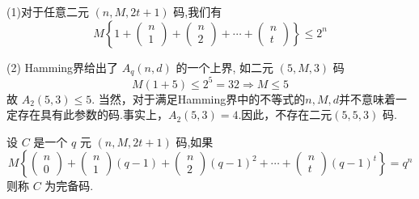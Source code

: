 \begin{remark}

(1)对于任意二元 $ (n, M, 2 t+1) $ 码,我们有
$$
M\left\{1+\left(\begin{array}{c}
n \\
1
\end{array}\right)+\left(\begin{array}{c}
n \\
2
\end{array}\right)+\cdots+\left(\begin{array}{c}
n \\
t
\end{array}\right)\right\} \leq 2^{n}
$$

(2) Hamming界给出了 $ A_{q}(n, d) $ 的一个上界, 如二元 $ (5, M, 3) $ 码
$$
M(1+5) \leq 2^{5}=32 \Rightarrow M \leq 5
$$
故 $ A_{2}(5,3) \leq 5 $. 当然，对于满足Hamming界中的不等式的$n,M,d$并不意味着一定存在具有此参数的码.事实上，$A_2(5,3)=4$.因此，不存在二元$(5,5,3)$ 码.
\end{remark}
\begin{definition}
    设 $ C $ 是一个 $ q $ 元 $ (n, M, 2 t+1) $ 码,如果
$$
M\left\{\left(\begin{array}{c}
n \\
0
\end{array}\right)+\left(\begin{array}{c}
n \\
1
\end{array}\right)(q-1)+\left(\begin{array}{c}
n \\
2
\end{array}\right)(q-1)^{2}+\cdots+\left(\begin{array}{c}
n \\
t
\end{array}\right)(q-1)^{t}\right\}=q^{n}
$$
则称 $ C $ 为完备码.
\end{definition}

